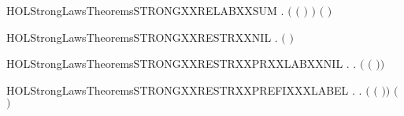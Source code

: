 \newcommand{\HOLStrongLawsTheoremsSTRONGXXRELABXXPREFIX}{\UseVerbatim{HOLStrongLawsTheoremsSTRONGXXRELABXXPREFIX}}
\begin{SaveVerbatim}{HOLStrongLawsTheoremsSTRONGXXRELABXXSUM}
\HOLTokenTurnstile{} \HOLSymConst{\HOLTokenForall{}}  .
        \ensuremath{(} \ensuremath{(} \HOLSymConst{\ensuremath{+}} \ensuremath{)} \ensuremath{)}
         \ensuremath{(}   \HOLSymConst{\ensuremath{+}}   \ensuremath{)}
\end{SaveVerbatim}
\newcommand{\HOLStrongLawsTheoremsSTRONGXXRELABXXSUM}{\UseVerbatim{HOLStrongLawsTheoremsSTRONGXXRELABXXSUM}}
\begin{SaveVerbatim}{HOLStrongLawsTheoremsSTRONGXXRESTRXXNIL}
\HOLTokenTurnstile{} \HOLSymConst{\HOLTokenForall{}}.  \ensuremath{(}  \ensuremath{)} 
\end{SaveVerbatim}
\newcommand{\HOLStrongLawsTheoremsSTRONGXXRESTRXXNIL}{\UseVerbatim{HOLStrongLawsTheoremsSTRONGXXRESTRXXNIL}}
\begin{SaveVerbatim}{HOLStrongLawsTheoremsSTRONGXXRESTRXXPRXXLABXXNIL}
\HOLTokenTurnstile{} \HOLSymConst{\HOLTokenForall{}} .
        \HOLConst{\HOLTokenIn{}}  \HOLSymConst{\HOLTokenDisj{}}   \HOLConst{\HOLTokenIn{}}  \HOLSymConst{\HOLTokenImp{}}
       \HOLSymConst{\HOLTokenForall{}}.  \ensuremath{(}  \ensuremath{(} \HOLSymConst{\ensuremath{\ldotp}}\ensuremath{)}\ensuremath{)} 
\end{SaveVerbatim}
\newcommand{\HOLStrongLawsTheoremsSTRONGXXRESTRXXPRXXLABXXNIL}{\UseVerbatim{HOLStrongLawsTheoremsSTRONGXXRESTRXXPRXXLABXXNIL}}
\begin{SaveVerbatim}{HOLStrongLawsTheoremsSTRONGXXRESTRXXPREFIXXXLABEL}
\HOLTokenTurnstile{} \HOLSymConst{\HOLTokenForall{}} .
        \HOLConst{\HOLTokenNotIn{}}  \HOLSymConst{\HOLTokenConj{}}   \HOLConst{\HOLTokenNotIn{}}  \HOLSymConst{\HOLTokenImp{}}
       \HOLSymConst{\HOLTokenForall{}}.  \ensuremath{(}  \ensuremath{(} \HOLSymConst{\ensuremath{\ldotp}}\ensuremath{)}\ensuremath{)} \ensuremath{(} \HOLSymConst{\ensuremath{\ldotp}}  \ensuremath{)}
\end{SaveVerbatim}
